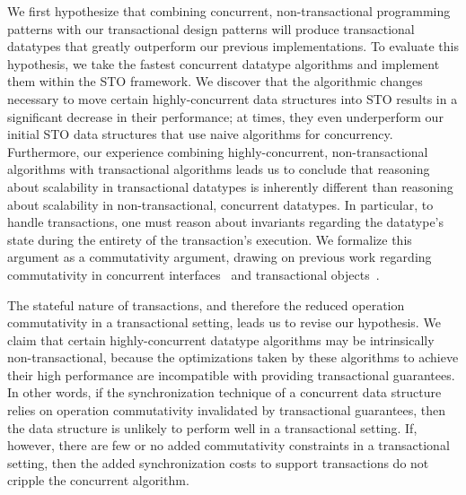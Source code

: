 We first hypothesize that combining concurrent, non-transactional programming patterns with our transactional design patterns will produce transactional datatypes that greatly outperform our previous implementations. To evaluate this hypothesis, we take the fastest concurrent datatype algorithms and implement them within the STO framework. We discover that the algorithmic changes necessary to move certain highly-concurrent data structures into STO results in a significant decrease in their performance; at times, they even underperform our initial STO data structures that use naive algorithms for concurrency.
Furthermore, our experience combining highly-concurrent, non-transactional algorithms with transactional algorithms leads us to conclude that reasoning about scalability in transactional datatypes is inherently different than reasoning about scalability in non-transactional, concurrent datatypes. In particular, to handle transactions, one must reason about invariants regarding the datatype's state during the entirety of the transaction's execution. We formalize this argument as a commutativity argument, drawing on previous work regarding commutativity in concurrent interfaces~\cite{scrule} and transactional objects~\cite{schwarz, weihl}.

The stateful nature of transactions, and therefore the reduced operation commutativity in a transactional setting, leads us to revise our hypothesis. 
We claim that certain highly-concurrent datatype algorithms may be intrinsically non-transactional, because the optimizations taken by these algorithms to achieve their high performance are incompatible with providing transactional guarantees. 
In other words, if the synchronization technique of a concurrent data structure relies on operation commutativity invalidated by transactional guarantees, then the data structure is unlikely to perform well in a transactional setting. 
If, however, there are few or no added commutativity constraints in a transactional setting, then the added synchronization costs to support transactions do not cripple the concurrent algorithm.

